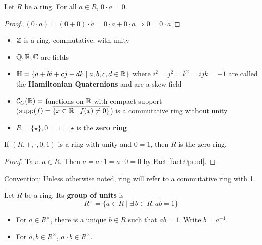 \begin{fact}\label{fact:0prod}
 Let $R$ be a ring. For all $a \in R$, $0 \cdot a = 0$.
\end{fact}
\begin{proof}
    $(0 \cdot a) = (0 + 0) \cdot a = 0 \cdot a + 0 \cdot a \Rightarrow 0 = 0 \cdot a$
\end{proof}
\begin{ex} \hspace{0.5cm}
    \begin{itemize}
        \item $\mathbb{Z}$ is a ring, commutative, with unity
        \item $\mathbb{Q}, \mathbb{R}, \mathbb{C}$ are fields
        \item $\mathbb{H} = \{a + bi + cj + dk \mid a,b,c,d \in \mathbb{R} \}$ where $i^2 = j^2 = k^2 = ijk = -1$ are
        called the \textbf{Hamiltonian Quaternions} and are a skew-field
        \item $\mathcal{C}_{C}(\mathbb{R}) = $ functions on $\mathbb{R}$ with compact
        support \\
        ($\operatorname{supp}(f) = \overline{\{x \in \mathbb{R} \mid f(x) \neq 0\}}$) is a
        commutative ring without unity
        \item $R = \{\star\}, 0 = 1 = \star$ is the \textbf{zero ring}.
    \end{itemize}
\end{ex}
\begin{fact}
    If $(R,+,\cdot,0,1)$ is a ring with unity and $0 = 1$, then $R$ is the zero ring.
\end{fact}
\begin{proof}
    Take $a \in R$. Then $a = a \cdot 1 = a \cdot 0 = 0$ by Fact \ref{fact:0prod}.
\end{proof}
\noindent \underline{Convention}: Unless otherwise noted, ring will refer to
a commutative ring with 1.
\begin{defn}
    Let $R$ be a ring. Its \textbf{group of units} is
    $$
    R^\times = \{a \in R \mid \exists \, b \in R: ab = 1\}
    $$
\end{defn}
\begin{fact} \hspace{0.5cm}
    \begin{itemize}
        \item For $a \in R^\times$, there is a unique $b \in R$ such that $ab = 1$.
        Write $b = a^{-1}$.
        \item For $a,b \in R^\times$, $a \cdot b \in R^\times$.
    \end{itemize}
\end{fact}
